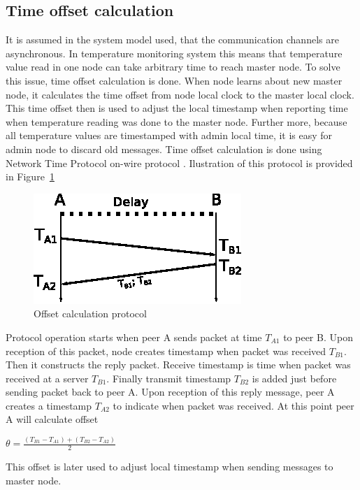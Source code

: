 \subsection{Time offset calculation}
\label{subsec:timesync}
It is assumed in the system model used, that the communication channels are asynchronous. In temperature monitoring system this means that temperature value read in one node can take arbitrary time to reach master node. To solve this issue, time offset calculation is done. When node learns about new master node, it calculates the time offset from node local clock to the master local clock. This time offset then is used to adjust the local timestamp when reporting time when temperature reading was done to the master node. Further more, because all temperature values are timestamped with admin local time, it is easy for admin node to discard old messages. Time offset calculation is done using Network Time Protocol on-wire protocol \cite{ntpv4_standard}. Ilustration of this protocol is provided in Figure~\ref{fig:timeoffset}
\begin{figure}[ht!]
\centering
    \includegraphics[scale=1]{eps/NTP_onwire_diagram}
\caption{Offset calculation protocol}
\label{fig:timeoffset}
\end{figure}

Protocol operation starts when peer A sends packet at time $T_{A1}$ to peer B. Upon reception of this packet, node creates timestamp when packet was received $T_{B1}$. Then it constructs the reply packet. Receive timestamp is time when packet was received at a server $T_{B1}$. Finally transmit timestamp $T_{B2}$ is added just before sending packet back to peer A. Upon reception of this reply message, peer A creates a timestamp $T_{A2}$ to indicate when packet was received. At this point peer A will calculate offset 

$\theta=\frac{(T_{B1}-T_{A1})+(T_{B2}-T_{A2})}{2}$

This offset is later used to adjust local timestamp when sending messages to master node.

